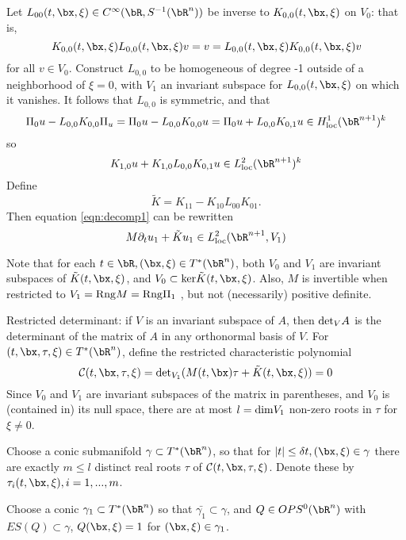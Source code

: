 Let  $L_{00}(t,\bx,\xi) \in C^{\infty}(\bR, S^{-1}(\bR^n))$ be inverse to $K_{0,0}(t,\bx,\xi)$ on $V_0$: that is,
\[
  K_{0,0}(t,\bx,\xi)L_{0,0}(t,\bx,\xi) v=v=L_{0,0}(t,\bx,\xi)K_{0,0}(t,\bx,\xi)v
\]
for all $v \in V_0$. Construct $L_{0,0}$ to be homogeneous of degree -1 outside of a neighborhood of $\xi=0$, with $V_1$ an invariant subspace for $L_{0,0}(t,\bx,\xi)$ on which it vanishes. It follows that $L_{0,0}$ is symmetric, and that
\[
  \Pi_0 u - L_{0,0}K_{0,0}\Pi_u = \Pi_0 u - L_{0,0}K_{0,0}u = \Pi_0 u + L_{0,0}K_{0,1}u \in H^{1}_{\rm loc}(\bR^{n+1})^k
\]
so
\[
  K_{1,0}u + K_{1,0}L_{0,0}K_{0,1}u \in L^2 _{\rm loc}(\bR^{n+1})^k
\]
Define
\[
  \tilde{K} = K_{11} - K_{10}L_{00}K_{01}.
\]
Then equation \ref{eqn:decomp1} can be rewritten
\begin{equation}
  \label{eqn:shs1}
  M\partial_t u_1 + \tilde{K}u_1 \in L^2_{\rm loc}(\bR^{n+1},V_1)
\end{equation}

Note that for each $t \in \bR, (\bx,\xi) \in T^*(\bR^n)$, both $V_0$ and $V_1$ are invariant subspaces of $\tilde{K}(t,\bx,\xi)$, and $V_0 \subset {\rm ker}\tilde{K}(t,\bx,\xi)$. Also, $M$ is invertible when restricted to $V_1 = {\rm Rng} M = {\rm Rng } \Pi_1$ , but not (necessarily) positive definite.
  
Restricted determinant: if $V$ is an invariant subspace of $A$, then ${\rm det}_{V} A$ is the determinant of the matrix of $A$ in any orthonormal basis of $V$.
For $(t,\bx,\tau,\xi) \in T^*(\bR^n)$, define the restricted characteristic polynomial
\[
  {\cal C}(t,\bx,\tau,\xi) = {\rm det}_{V_1} (M(t,\bx)\tau + \tilde{K}(t,\bx,\xi) )= 0
\]
Since $V_0$ and $V_1$ are invariant subspaces of the matrix in parentheses, and $V_0$ is (contained in) its null space, there are at most $l={\rm dim}V_1$ non-zero roots in $\tau$ for $\xi \ne 0$.

Choose a conic submanifold $\gamma \subset T^*(\bR^n)$, so that for $|t| \le \delta t, (\bx,\xi) \in \gamma$ there are exactly $m \le l$ distinct real roots $\tau$ of ${\cal C}(t,\bx,\tau,\xi)$. Denote these by $\tau_i(t,\bx,\xi), i=1,...,m$.

Choose a conic $\gamma_1 \subset T^*(\bR^n)$ so that $\bar{\gamma_1} \subset \gamma$, and $Q \in OPS^0(\bR^n)$ with $ES(Q) \subset \gamma$, $Q(\bx,\xi) =1$ for $(\bx,\xi)\in \gamma_1$.


